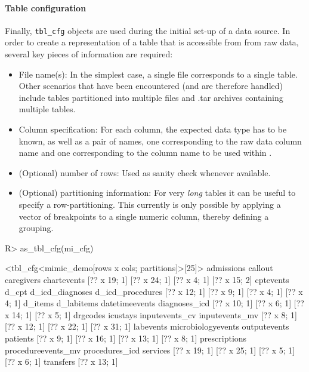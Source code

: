 \documentclass[
]{jss}
\begin{document}
\hypertarget{table-configuration}{%
\paragraph{Table configuration}\label{table-configuration}}

Finally, \texttt{tbl\_cfg} objects are used during the initial set-up of
a data source. In order to create a representation of a table that is
accessible from  from raw data, several key pieces of
information are required:

\begin{itemize}
\item
  File name(s): In the simplest case, a single file corresponds to a
  single table. Other scenarios that have been encountered (and are
  therefore handled) include tables partitioned into multiple files and
  .tar archives containing multiple tables.
\item
  Column specification: For each column, the expected data type has to
  be known, as well as a pair of names, one corresponding to the raw
  data column name and one corresponding to the column name to be used
  within .
\item
  (Optional) number of rows: Used as sanity check whenever available.
\item
  (Optional) partitioning information: For very \emph{long} tables it
  can be useful to specify a row-partitioning. This currently is only
  possible by applying a vector of breakpoints to a single numeric
  column, thereby defining a grouping.
\end{itemize}

\begin{CodeChunk}
\begin{CodeInput}
R> as_tbl_cfg(mi_cfg)
\end{CodeInput}
\begin{CodeOutput}
<tbl_cfg<mimic_demo[rows x cols; partitions]>[25]>
        admissions            callout         caregivers        chartevents 
      [?? x 19; 1]       [?? x 24; 1]        [?? x 4; 1]       [?? x 15; 2] 
         cptevents              d_cpt    d_icd_diagnoses   d_icd_procedures 
      [?? x 12; 1]        [?? x 9; 1]        [?? x 4; 1]        [?? x 4; 1] 
           d_items         d_labitems     datetimeevents      diagnoses_icd 
      [?? x 10; 1]        [?? x 6; 1]       [?? x 14; 1]        [?? x 5; 1] 
          drgcodes           icustays     inputevents_cv     inputevents_mv 
       [?? x 8; 1]       [?? x 12; 1]       [?? x 22; 1]       [?? x 31; 1] 
         labevents microbiologyevents       outputevents           patients 
       [?? x 9; 1]       [?? x 16; 1]       [?? x 13; 1]        [?? x 8; 1] 
     prescriptions procedureevents_mv     procedures_icd           services 
      [?? x 19; 1]       [?? x 25; 1]        [?? x 5; 1]        [?? x 6; 1] 
         transfers 
      [?? x 13; 1] 
\end{CodeOutput}
\end{CodeChunk}
\end{document}
